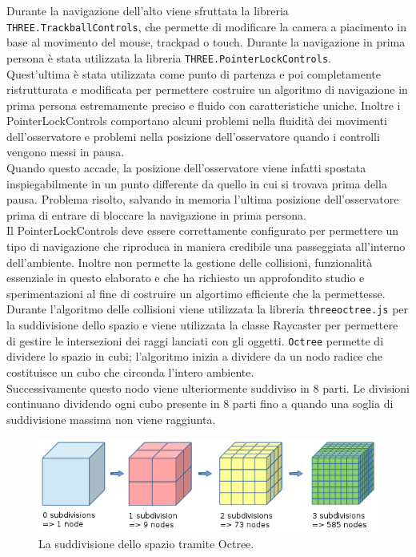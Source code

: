 Durante la navigazione dell’alto viene sfruttata la libreria \texttt{THREE.TrackballControls}, che permette di modificare la camera a piacimento in base al movimento del mouse, trackpad o touch. Durante la navigazione in prima persona è stata utilizzata la libreria \texttt{THREE.PointerLockControls}.
\\
Quest’ultima è stata utilizzata come punto di partenza e poi completamente ristrutturata e modificata per permettere costruire un algoritmo di navigazione in prima persona estremamente preciso e fluido con caratteristiche uniche.
Inoltre i PointerLockControls comportano alcuni problemi nella fluidità dei movimenti dell’osservatore e problemi nella posizione dell’osservatore quando i controlli vengono messi in pausa.
\\
Quando questo accade, la posizione dell’osservatore viene infatti spostata inspiegabilmente in un punto differente da quello in cui si trovava prima della pausa. Problema risolto, salvando in memoria l’ultima posizione dell’osservatore prima di entrare di bloccare la navigazione in prima persona.
\\
Il PointerLockControls deve essere correttamente configurato per permettere un tipo di navigazione che riproduca in maniera credibile una passeggiata all’interno dell’ambiente.
Inoltre non permette la gestione delle collisioni, funzionalità essenziale in questo elaborato e che ha richiesto un approfondito studio e sperimentazioni al fine di costruire un algortimo efficiente che la permettesse.
\\
Durante l’algoritmo delle collisioni viene utilizzata la libreria \texttt{threeoctree.js} per la suddivisione dello spazio e viene utilizzata la classe Raycaster per permettere di gestire le intersezioni dei raggi lanciati con gli oggetti.
\texttt{Octree} permette di dividere lo spazio in cubi; l’algoritmo inizia a dividere da un nodo radice che costituisce un cubo che circonda l’intero ambiente.
\\
Successivamente questo nodo viene ulteriormente suddiviso in 8 parti. Le divisioni continuano dividendo ogni cubo presente in 8 parti fino a quando una soglia di suddivisione massima non viene raggiunta.

\begin{figure}[htb]
 \centering
 \includegraphics[width=1\linewidth]{images/chapter_navigazione_scena/full_octree.png}\hfill
 \caption[Octree e la suddivisione dello spazio.]{La suddivisione dello spazio tramite Octree.}
 \label{fig:navigazione_scena_collision_full_octree}
\end{figure}

